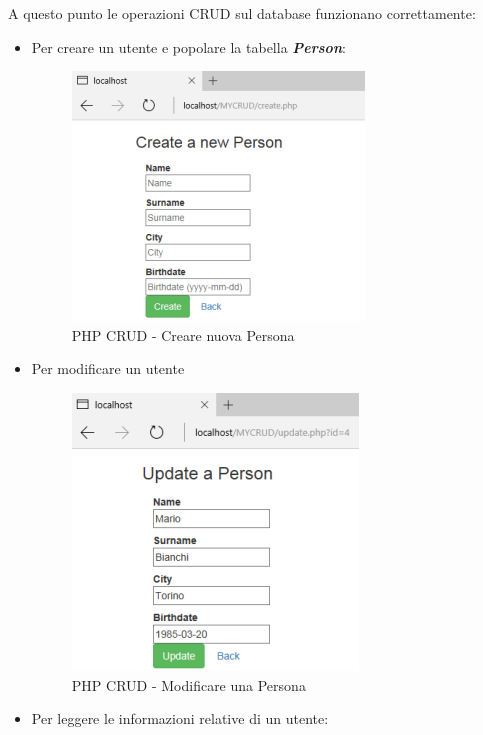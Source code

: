 A questo punto le operazioni CRUD sul database funzionano correttamente:

\begin{itemize}

\item Per creare un utente e popolare la tabella \textit{\textbf{Person}}:

\begin{center}
\begin{figure}[H]
\centering
\includegraphics[scale=1]{figures/createnewperson.png}
\caption{PHP CRUD - Creare nuova Persona} 
\end{figure}
\end{center}

\item Per modificare un utente 

\begin{center}
\begin{figure}[H]
\centering
\includegraphics[scale=1]{figures/updateperson.png}
\caption{PHP CRUD - Modificare una Persona} 
\end{figure}
\end{center}

\item Per leggere le informazioni relative di un utente: 


\end{itemize}
